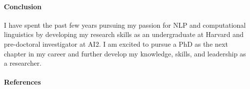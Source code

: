 \documentclass[11pt]{article}
\begin{document}
\paragraph{Conclusion}

I have spent the past few years pursuing my passion for NLP 
and computational linguistics by
developing my research skills as an undergraduate at Harvard
and pre-doctoral investigator at AI2.
I am excited to pursue a PhD as the next chapter in my career
and further develop my knowledge, skills, and leadership as a researcher. 

\paragraph{References}

\clearpage


\end{document}
